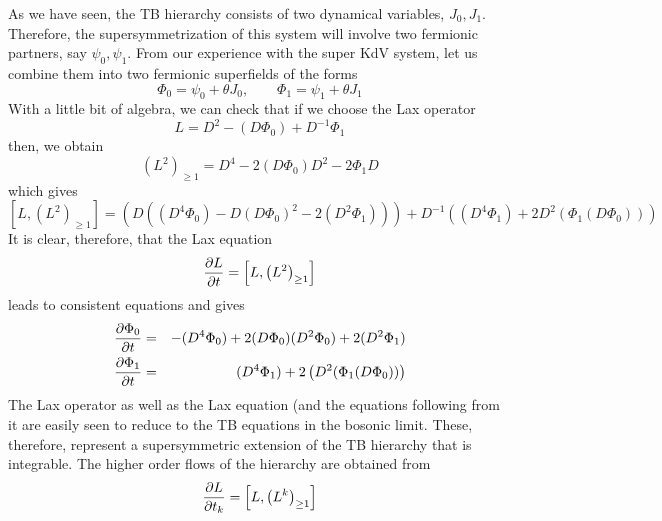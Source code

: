 \documentclass[a4paper,11pt]{article}
\begin{document}
As we have seen, the TB hierarchy consists of two dynamical variables,
$J_{0},J_{1}$. Therefore, the supersymmetrization of this system will
involve two fermionic partners, say $\psi_{0},\psi_{1}$. From our
experience with the super KdV system, let us combine them into two
fermionic superfields of the forms
\begin{equation}
\Phi_{0} = \psi_{0} + \theta J_{0},\qquad \Phi_{1} = \psi_{1} + \theta
J_{1}
\end{equation}
With a little bit of algebra, we can check that if we choose the Lax
operator
\begin{equation}
L = D^{2} - (D\Phi_{0}) + D^{-1} \Phi_{1}
\end{equation}
then, we obtain
\begin{equation}
\left(L^{2}\right)_{\geq 1} = D^{4} - 2 (D\Phi_{0}) D^{2} - 2 \Phi_{1}
D
\end{equation}
which gives
\begin{equation}
\left[L , \left(L^{2}\right)_{\geq 1}\right] =
\left(D\left((D^{4}\Phi_{0}) - D(D\Phi_{0})^{2} - 2
(D^{2}\Phi_{1})\right)\right) + D^{-1} \left((D^{4}\Phi_{1}) + 2
D^{2}(\Phi_{1}(D\Phi_{0}))\right)
\end{equation}
It is clear, therefore, that the Lax equation
\begin{equation}
{\partial L\over \partial t} = \left[L , \left(L^{2}\right)_{\geq
1}\right]
\end{equation}
leads to consistent equations and gives
\begin{eqnarray}
{\partial \Phi_{0}\over \partial t} & = & - (D^{4}\Phi_{0}) + 2
(D\Phi_{0})(D^{2}\Phi_{0}) + 2 (D^{2}\Phi_{1})\nonumber\\
{\partial \Phi_{1}\over \partial t} & = & (D^{4}\Phi_{1}) + 2
\left(D^{2}(\Phi_{1}(D\Phi_{0}))\right)
\end{eqnarray}
The Lax operator as well as the Lax equation (and the equations
following from it are easily seen to reduce to the TB equations in the
bosonic limit.  These, therefore, represent a supersymmetric extension
of the TB hierarchy that is integrable. The higher order flows of the
hierarchy are obtained from
\begin{equation}
{\partial L\over \partial t_{k}} = \left[ L , \left(L^{k}\right)_{\geq
1}\right]
\end{equation}
\end{document}
